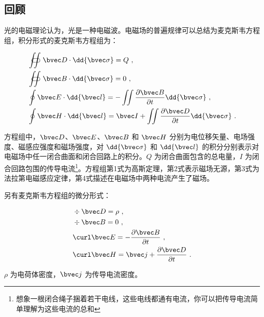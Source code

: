 

\subsection{回顾}

光的电磁理论认为，光是一种电磁波。电磁场的普遍规律可以总结为麦克斯韦方程组，积分形式的麦克斯韦方程组为：

\begin{equation}
\begin{aligned}
& \displaystyle \iint\!\!\!\!\!\!\!\!\!\!\subset\!\supset \bvec D \cdot \dd{\bvec \sigma} = Q ~, \\
& \displaystyle \iint\!\!\!\!\!\!\!\!\!\!\subset\!\supset \bvec B \cdot \dd{\bvec \sigma} = 0 ~, \\
& \oint \bvec E \cdot \dd{\bvec l} = - \iint \frac{\partial \bvec B}{\partial t} \dd{\bvec \sigma} ~, \\
& \oint \bvec H \cdot \dd{\bvec l} = \bvec I + \iint \frac{\partial \bvec D}{\partial t} \dd{\bvec \sigma} ~.
\end{aligned}
\end{equation}

方程组中，$\bvec D$、$\bvec E$、$\bvec B$ 和 $\bvec H$ 分别为电位移矢量、电场强度、磁感应强度和磁场强度，对 $\dd{\bvec \sigma}$ 和 $\dd{\bvec l}$ 的积分分别表示对电磁场中任一闭合曲面和闭合回路上的积分。$Q$ 为闭合曲面包含的总电量，$I$ 为闭合回路包围的传导电流\footnote{想象一根闭合绳子捆着若干电线，这些电线都通有电流，你可以把传导电流简单理解为这些电流的总和}。方程组第1式为高斯定理，第2式表示磁场无源，第3式为法拉第电磁感应定律，第4式描述在电磁场中两种电流产生了磁场。

另有麦克斯韦方程组的微分形式：

\begin{equation}
\begin{aligned}
& \div \bvec D = \rho ~, \\
& \div \bvec B = 0 ~, \\
& \curl \bvec E = -\frac{\partial \bvec B}{\partial t} ~, \\
& \curl \bvec H = \bvec j + \frac{\partial \bvec D}{\partial t} ~.
\end{aligned}
\end{equation}

$\rho$ 为电荷体密度，$\bvec j$ 为传导电流密度。

